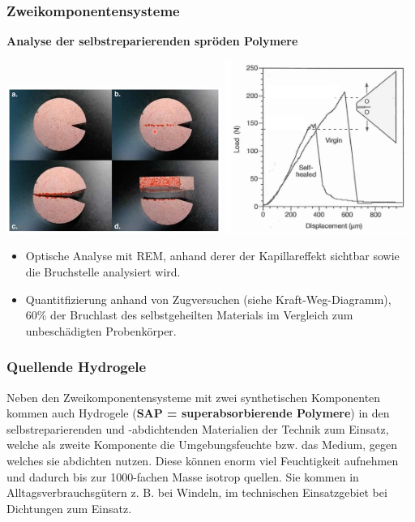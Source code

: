 \subsubsection{Zweikomponentensysteme}

\textbf{Analyse der selbstreparierenden spröden Polymere}\\

\begin{center}
    \includegraphics[width=7cm]{lec5/figures/selbstheilung-technik-2.png}
    \includegraphics[width=6cm]{lec5/figures/zugversuch.png}
\end{center}

\begin{itemize}
    \item Optische Analyse mit REM, anhand derer der Kapillareffekt sichtbar sowie die Bruchstelle analysiert wird.
    \item Quantitfizierung anhand von Zugversuchen (siehe Kraft-Weg-Diagramm), 60\% der Bruchlast des selbstgeheilten Materials im Vergleich zum unbeschädigten Probenkörper.
\end{itemize}

\subsubsection{Quellende Hydrogele}

Neben den Zweikomponentensysteme mit zwei synthetischen Komponenten kommen auch Hydrogele (\textbf{SAP = superabsorbierende Polymere}) in den selbstreparierenden und -abdichtenden Materialien der Technik zum Einsatz, welche als zweite Komponente die Umgebungsfeuchte bzw. das Medium, gegen welches sie abdichten nutzen. Diese können enorm viel Feuchtigkeit aufnehmen und dadurch bis zur 1000-fachen Masse isotrop quellen. Sie kommen in Alltagsverbrauchsgütern z. B. bei Windeln, im technischen Einsatzgebiet bei Dichtungen zum Einsatz.\\

